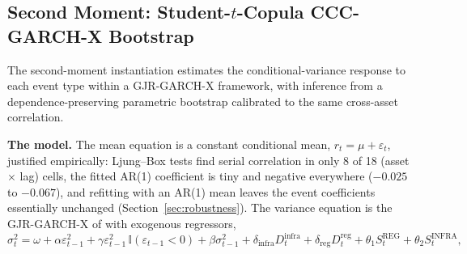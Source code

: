 \documentclass[pdflatex,sn-mathphys-num]{sn-jnl}
\theoremstyle{thmstyleone}
\theoremstyle{thmstyletwo}
\theoremstyle{thmstylethree}
\begin{document}
\subsection{Second Moment: Student-$t$-Copula CCC-GARCH-X Bootstrap}\label{sec:methods_var}

The second-moment instantiation estimates the conditional-variance response to each event type within a GJR-GARCH-X framework, with inference from a dependence-preserving parametric bootstrap calibrated to the same cross-asset correlation.

\textbf{The model.} The mean equation is a constant conditional mean, $r_t = \mu + \varepsilon_t$, justified empirically: Ljung--Box tests find serial correlation in only 8 of 18 (asset $\times$ lag) cells, the fitted AR(1) coefficient is tiny and negative everywhere ($-0.025$ to $-0.067$), and refitting with an AR(1) mean leaves the event coefficients essentially unchanged (Section~\ref{sec:robustness}). The variance equation is the GJR-GARCH-X of \citet{GlostenEtAl1993} with exogenous regressors,
\begin{equation}
\sigma^2_t = \omega + \alpha \varepsilon^2_{t-1} + \gamma \varepsilon^2_{t-1}\,\mathbb{I}(\varepsilon_{t-1}<0) + \beta \sigma^2_{t-1} + \delta_{\text{infra}} D^{\text{infra}}_t + \delta_{\text{reg}} D^{\text{reg}}_t + \theta_1 S^{\text{REG}}_t + \theta_2 S^{\text{INFRA}}_t,
\end{equation}
\end{document}
